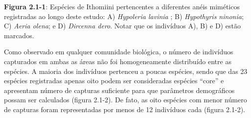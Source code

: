 \textbf{Figura 2.1-1}: Espécies de Ithomiini pertencentes a diferentes anéis miméticos registradas ao longo deste estudo: A) \textit{Hypoleria lavinia} ; B) \textit{Hypothyris ninonia}; C) \textit{Aeria olena}; e D) \textit{Dircenna dero}. Notar que os indivíduos A), B) e D) estão marcados.

Como observado em qualquer comunidade biológica, o número de indivíduos capturados em ambas as áreas não foi homogeneamente distribuído entre as espécies. A maioria dos indivíduos pertenceu a poucas espécies, sendo que das 23 espécies registradas apenas oito podem ser consideradas espécies “core” e apresentam número de capturas suficiente para que parâmetros demográficos possam ser calculados (figura 2.1-2). De fato, as oito espécies com menor número de capturas foram representadas por menos de 12 indivíduos cada (figura 2.1-2).